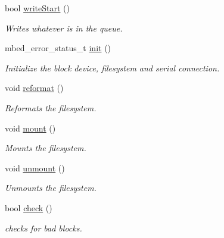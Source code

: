 \begin{DoxyCompactItemize}
bool \mbox{\hyperlink{class_sat_file_handler_a458d6cf20f9384c4ef1c0ce3f57d1ab1}{write\+Start}} ()
\begin{DoxyCompactList}\small\item\em Writes whatever is in the queue. \end{DoxyCompactList}\item 
mbed\+\_\+error\+\_\+status\+\_\+t \mbox{\hyperlink{class_sat_file_handler_aacd220dabbabf695b7ee32e526baeb5e}{init}} ()
\begin{DoxyCompactList}\small\item\em Initialize the block device, filesystem and serial connection. \end{DoxyCompactList}\item 
\mbox{\label{class_sat_file_handler_ad36c9457caeb65eed6418190aa8565e2}} 
void \mbox{\hyperlink{class_sat_file_handler_ad36c9457caeb65eed6418190aa8565e2}{reformat}} ()
\begin{DoxyCompactList}\small\item\em Reformats the filesystem. \end{DoxyCompactList}\item 
\mbox{\label{class_sat_file_handler_a4b0bc1aeabc8d1230aadec9ad1207e3d}} 
void \mbox{\hyperlink{class_sat_file_handler_a4b0bc1aeabc8d1230aadec9ad1207e3d}{mount}} ()
\begin{DoxyCompactList}\small\item\em Mounts the filesystem. \end{DoxyCompactList}\item 
\mbox{\label{class_sat_file_handler_a3281befca1d7df2e4035cec885c161ae}} 
void \mbox{\hyperlink{class_sat_file_handler_a3281befca1d7df2e4035cec885c161ae}{unmount}} ()
\begin{DoxyCompactList}\small\item\em Unmounts the filesystem. \end{DoxyCompactList}\item 
\mbox{\label{class_sat_file_handler_ad404c0cfc5ee0fea8d19b6be6627954d}} 
bool \mbox{\hyperlink{class_sat_file_handler_ad404c0cfc5ee0fea8d19b6be6627954d}{check}} ()
\begin{DoxyCompactList}\small\item\em checks for bad blocks. \end{DoxyCompactList}\item 

\end{DoxyCompactItemize}
